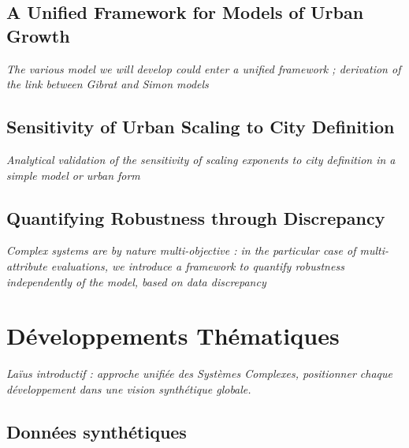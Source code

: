\subsection{A Unified Framework for Models of Urban Growth}

\textit{The various model we will develop could enter a unified framework ; derivation of the link between Gibrat and Simon models}


\subsection{Sensitivity of Urban Scaling to City Definition}

\textit{Analytical validation of the sensitivity of scaling exponents to city definition in a simple model or urban form}

\subsection{Quantifying Robustness through Discrepancy}

\textit{Complex systems are by nature multi-objective : in the particular case of multi-attribute evaluations, we introduce a framework to quantify robustness independently of the model, based on data discrepancy~\cite{raimbault2016discrepancy}}






\section{Développements Thématiques}

\textit{Laïus introductif : approche unifiée des Systèmes Complexes, positionner chaque développement dans une vision synthétique globale.} 

\subsection{Données synthétiques}

